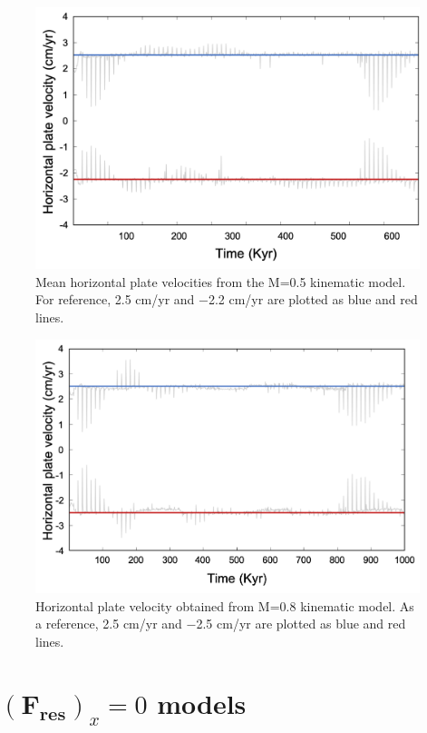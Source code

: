 \documentclass[letterpaper,12pt,notitle]{memphisthesis}                     %
\begin{document}
\begin{figure}[!htb]
	\centering
	\includegraphics[width=0.9\linewidth]{./figs/km05.png}
	\caption{Mean horizontal plate velocities from the M=0.5 kinematic model. For reference, 2.5 cm/yr and $-$2.2 cm/yr are plotted as blue and red lines.}
	\label{fig:km05}
\end{figure}
\begin{figure}[!htb]
	\centering
	\includegraphics[width=0.9\linewidth]{./figs/km08.png}
	\caption{Horizontal plate velocity obtained from M=0.8 kinematic model. As a reference, 2.5 cm/yr and $-$2.5 cm/yr are plotted as blue and red lines.}
	\label{fig:km08}
\end{figure}



\section{$(\boldsymbol{F_{res}})_x=0$ models}
\end{document}
